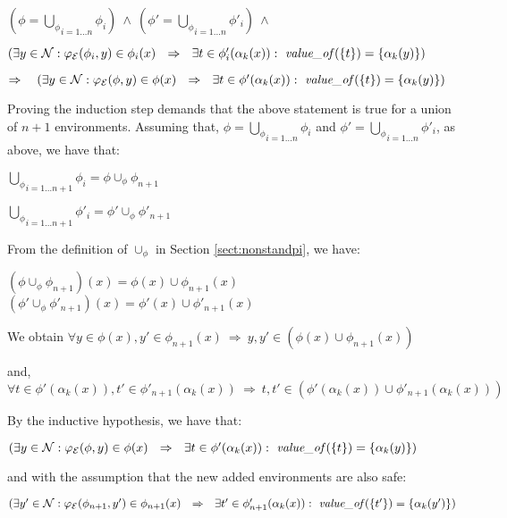 \documentclass[10pt,a4paper,final,oneside,fleqn]{book}
\begin{document}
\noindent
$(\phi=\underset{i=1\ldots n}{\bigcup_\phi}\phi_i)~\wedge~(\phi'=\underset{i=1\ldots n}{\bigcup_\phi}\phi'_i)~\wedge$

\noindent
$(\exists y\in\mathcal{N}:\varphi_\mathcal{E}(\phi_i,y)\in\phi_i(x)~~\Rightarrow~~\exists t\in\phi'_i(\alpha_k(x)):~\mbox{{\itshape value\_of\/}}(\{t\})=\{\alpha_k(y)\})$\vspace{5mm}

\noindent
$\Rightarrow~~~(\exists y\in\mathcal{N}:\varphi_\mathcal{E}(\phi,y)\in\phi(x)~~\Rightarrow~~\exists t\in\phi'(\alpha_k(x)):~\mbox{{\itshape value\_of\/}}(\{t\})=\{\alpha_k(y)\})$\vspace{5mm}

\noindent
Proving the induction step demands that the above statement is true for a union of $n+1$ environments.  Assuming that, $\phi=\underset{i=1\ldots n}{\bigcup_\phi}\phi_i$ and $\phi'=\underset{i=1\ldots n}{\bigcup_\phi}\phi'_i$, as above, we have that:

\noindent
$\underset{i=1\ldots {n+1}}{\bigcup_\phi}\phi_i=\phi\cup_\phi\phi_{n+1}$

\noindent
$\underset{i=1\ldots {n+1}}{\bigcup_\phi}\phi'_i=\phi'\cup_\phi\phi'_{n+1}$\vspace{5mm}

\noindent
From the definition of $\cup_\phi$ in Section \ref{sect:nonstandpi}, we have:

\noindent
$(\phi\cup_\phi\phi_{n+1})(x)=\phi(x)\cup\phi_{n+1}(x)$\\
$(\phi'\cup_\phi\phi'_{n+1})(x)=\phi'(x)\cup\phi'_{n+1}(x)$\vspace{5mm}

\noindent
We obtain $\forall y\in\phi(x),y'\in\phi_{n+1}(x)~\Rightarrow~y,y'\in(\phi(x)\cup\phi_{n+1}(x))$

\noindent
and, $\forall t\in\phi'(\alpha_k(x)),t'\in\phi'_{n+1}(\alpha_k(x))~\Rightarrow~t,t'\in(\phi'(\alpha_k(x))\cup\phi'_{n+1}(\alpha_k(x)))$\vspace{5mm}

\noindent
By the inductive hypothesis, we have that:

\noindent
$(\exists y\in\mathcal{N}:\varphi_\mathcal{E}(\phi,y)\in\phi(x)~~\Rightarrow~~\exists t\in\phi'(\alpha_k(x)):~\mbox{{\itshape value\_of\/}}(\{t\})=\{\alpha_k(y)\})$\vspace{5mm}

\noindent
and with the assumption that the new added environments are also safe:

\noindent
$(\exists y'\in\mathcal{N}:\varphi_\mathcal{E}(\phi_{n+1},y')\in\phi_{n+1}(x)~~\Rightarrow~~\exists t'\in\phi'_{n+1}(\alpha_k(x)):~\mbox{{\itshape value\_of\/}}(\{t'\})=\{\alpha_k(y')\})$\vspace{5mm}
\end{document}
